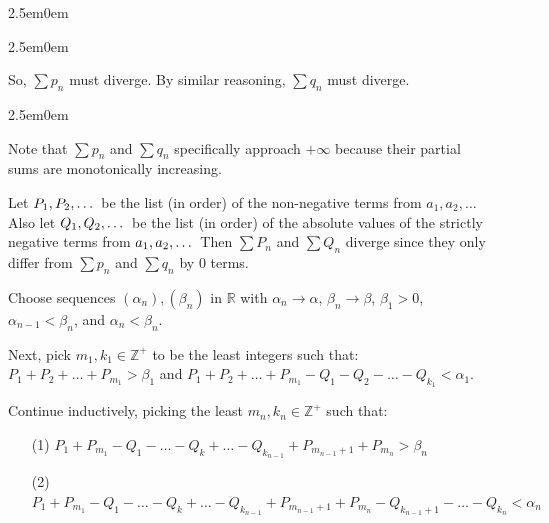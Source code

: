 \documentclass{book}
\newcommand{\hThree}{%
   \color{PineGreen}
   \fontsize{13}{15}\selectfont%
}
\newcommand{\hFour}{%
   \color{Cerulean}
   \fontsize{12}{14}\selectfont%
}
\newenvironment{myIndent}{%
   \begin{adjustwidth}{2.5em}{0em}%
}{%
   \end{adjustwidth}%
}
\newcommand{\retTwo}{\hfill\bigbreak}
\begin{document}
{\begin{myIndent}
\begin{myIndent}
         So, $\sum p_n$ must diverge. By similar reasoning, $\sum q_n$ must diverge.
         {\begin{myIndent} \hFour
            Note that $\sum p_n$ and $\sum q_n$ specifically approach $+\infty$ because their partial\\ sums are monotonically increasing.
            \retTwo
         \end{myIndent}}

         Let $P_1, P_2, \ldots \hspace{0.2em}$ be the list (in order) of the non-negative terms from $a_1, a_2, \ldots$\\ Also let $Q_1, Q_2, \ldots \hspace{0.2em}$ be the list (in order) of the absolute values of the strictly negative terms from $a_1, a_2, \ldots \hspace{0.2em}$ Then $\sum P_n$ and $\sum Q_n$ diverge since they only differ from $\sum p_n$ and $\sum q_n$ by $0$ terms.\retTwo

         Choose sequences $(\alpha_n), (\beta_n)$ in $\mathbb{R}$ with $\alpha_n \rightarrow \alpha$, $\beta_n \rightarrow \beta$, $\beta_1 > 0$,\\
         $\alpha_{n-1} < \beta_n$, and $\alpha_n < \beta_n$. \retTwo

         Next, pick $m_1, k_1 \in \mathbb{Z}^+$ to be the least integers such that:\\ $P_1 + P_2 + \ldots + P_{m_1} > \beta_1$ and $P_1 + P_2 + \ldots + P_{m_1} - Q_1 - Q_2 - \ldots - Q_{k_1} < \alpha_1$. \retTwo

         Continue inductively, picking the least $m_n, k_n \in \mathbb{Z}^+$ such that:
      \end{myIndent}
      \end{myIndent}}{\hThree
      \begin{enumerate} 
         \item[(1)] $P_1 + P_{m_1} - Q_1 - \ldots - Q_k + \ldots - Q_{k_{n-1}} + P_{m_{n-1} + 1} + P_{m_n} > \beta_n$
         \item[(2)] $P_1 + P_{m_1} - Q_1 - \ldots - Q_k + \ldots - Q_{k_{n-1}} + P_{m_{n-1} + 1} + P_{m_n} - Q_{k_{n-1} + 1} - \ldots - Q_{k_n} < \alpha_n$
      \end{enumerate}
      }
\end{document}
